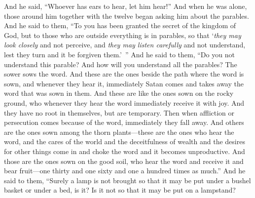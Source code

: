 \begin{biblechapter}
\verse And he said, “Whoever has ears to hear, let him hear!”
 And when he was alone, those around him together with the twelve began asking him about the parables.
\verse And he said to them, “To you has been granted the secret of the kingdom of God, but to those who are outside everything is in parables,
\verse so that ‘\textit{they may look closely} and not perceive, 
and \textit{they may listen carefully} and not understand, 
lest they turn and it be forgiven them.’ ”
 And he said to them, “Do you not understand this parable? And how will you understand all the parables?
\verse The sower sows the word.
\verse And these are the ones beside the path where the word is sown, and whenever they hear it, immediately Satan comes and takes away the word that was sown in them.
\verse And these are like the ones sown on the rocky ground, who whenever they hear the word immediately receive it with joy.
\verse And they have no root in themselves, but are temporary. Then when affliction or persecution comes because of the word, immediately they fall away.
\verse And others are the ones sown among the thorn plants—these are the ones who hear the word,
\verse and the cares of the world and the deceitfulness of wealth and the desires for other things come in and choke the word and it becomes unproductive.
\verse And those are the ones sown on the good soil, who hear the word and receive it and bear fruit—one thirty and one sixty and one a hundred times as much.”
 And he said to them, “Surely a lamp is not brought so that it may be put under a bushel basket or under a bed, is it? Is it not so that it may be put on a lampstand?

\end{biblechapter}

